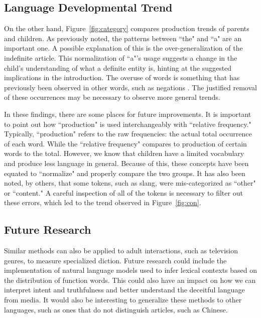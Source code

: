 \documentclass{article}
\theoremstyle{plain}
\theoremstyle{definition}
\theoremstyle{remark}
\numberwithin{equation}{section}
\begin{document}
\subsection{Language Developmental Trend}
On the other hand, Figure~\ref{fig:category} compares production trends of parents and children. As previously noted, the patterns between ``the" and ``a" are an important one. A possible explanation of this is the over-generalization of the indefinite article. This normalization of ``a"'s usage suggests a change in the child's understanding of what a definite entity is, hinting at the suggested implications in the introduction. The overuse of words is something that has previously been observed in other words, such as negations \cite{jasbi2020neg}. The justified removal of these occurrences may be necessary to observe more general trends.

In these findings, there are some places for future improvements. It is important to point out how ``production" is used interchangeably with ``relative frequency." Typically, ``production" refers to the raw frequencies: the actual total occurrence of each word. While the ``relative frequency" compares to production of certain words to the total. However, we know that children have a limited vocabulary and produce less language in general. Because of this, these concepts have been equated to ``normalize" and properly compare the two groups. It has also been noted, by others, that some tokens, such as slang, were mis-categorized as ``other" or ``content." A careful inspection of all of the tokens is necessary to filter out these errors, which led to the trend observed in Figure~\ref{fig:con}.

\subsection{Future Research}
Similar methods can also be applied to adult interactions, such as television genres, to measure specialized diction. Future research could include the implementation of natural language models used to infer lexical contexts based on the distribution of function words. This could also have an impact on how we can interpret intent and truthfulness and better understand the deceitful language from media. It would also be interesting to generalize these methods to other languages, such as ones that do not distinguish articles, such as Chinese. 

 

\end{document}
